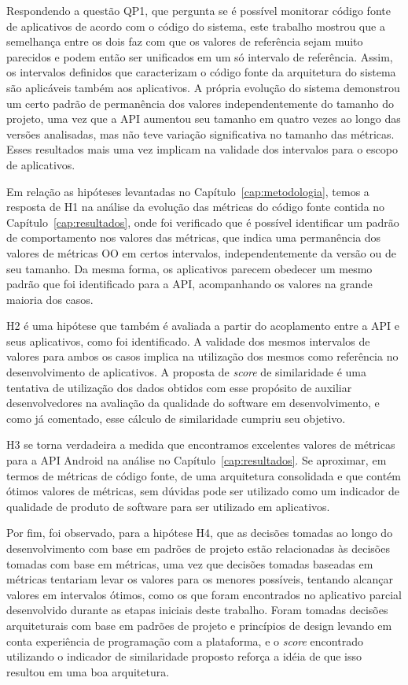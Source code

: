Respondendo a questão QP1, que pergunta se é possível monitorar código fonte de aplicativos de acordo com o código do sistema, este trabalho mostrou que a semelhança entre os dois faz com que os valores de referência sejam muito parecidos e podem então ser unificados em um só intervalo de referência. Assim, os intervalos definidos que caracterizam o código fonte da arquitetura do sistema são aplicáveis também aos aplicativos. A própria evolução do sistema demonstrou um certo padrão de permanência dos valores independentemente do tamanho do projeto, uma vez que a API aumentou seu tamanho em quatro vezes ao longo das versões analisadas, mas não teve variação significativa no tamanho das métricas. Esses resultados mais uma vez implicam na validade dos intervalos para o escopo de aplicativos.

Em relação as hipóteses levantadas no Capítulo~\ref{cap:metodologia}, temos a resposta de H1 na análise da evolução das métricas do código fonte contida no Capítulo~\ref{cap:resultados}, onde foi verificado que é possível identificar um padrão de comportamento nos valores das métricas, que indica uma permanência dos valores de métricas OO em certos intervalos, independentemente da versão ou de seu tamanho. Da mesma forma, os aplicativos parecem obedecer um mesmo padrão que foi identificado para a API, acompanhando os valores na grande maioria dos casos.

H2 é uma hipótese que também é avaliada a partir do acoplamento entre a API e seus aplicativos, como foi identificado. A validade dos mesmos intervalos de valores para ambos os casos implica na utilização dos mesmos como referência no desenvolvimento de aplicativos. A proposta de \textit{score} de similaridade é uma tentativa de utilização dos dados obtidos com esse propósito de auxiliar desenvolvedores na avaliação da qualidade do software em desenvolvimento, e como já comentado, esse cálculo de similaridade cumpriu seu objetivo.

H3 se torna verdadeira a medida que encontramos excelentes valores de métricas para a API Android na análise no Capítulo~\ref{cap:resultados}. Se aproximar, em termos de métricas de código fonte, de uma arquitetura consolidada e que contém ótimos valores de métricas, sem dúvidas pode ser utilizado como um indicador de qualidade de produto de software para ser utilizado em aplicativos.

Por fim, foi observado, para a hipótese H4, que as decisões tomadas ao longo do desenvolvimento com base em padrões de projeto estão relacionadas às decisões tomadas com base em métricas, uma vez que decisões tomadas baseadas em métricas tentariam levar os valores para os menores possíveis, tentando alcançar valores em intervalos ótimos, como os que foram encontrados no aplicativo parcial desenvolvido durante as etapas iniciais deste trabalho. Foram tomadas decisões arquiteturais com base em padrões de projeto e princípios de design levando em conta experiência de programação com a plataforma, e o \textit{score} encontrado utilizando o indicador de similaridade proposto reforça a idéia de que isso resultou em uma boa arquitetura.


